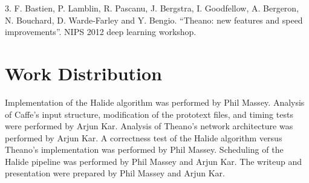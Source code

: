 \documentclass[11pt,twoside]{article}
\begin{document}
3.  F. Bastien, P. Lamblin, R. Pascanu, J. Bergstra, I. Goodfellow, A. Bergeron, N. Bouchard, D. Warde-Farley and Y. Bengio. “Theano: new features and speed improvements”. NIPS 2012 deep learning workshop.

\section{Work Distribution}

Implementation of the Halide algorithm was performed by Phil Massey.  
Analysis of Caffe's input structure, modification of the prototext files, and timing tests were performed by Arjun Kar.  
Analysis of Theano's network architecture was performed by Arjun Kar.  
A correctness test of the Halide algorithm versus Theano's implementation was performed by Phil Massey. 
Scheduling of the Halide pipeline was performed by Phil Massey and Arjun Kar.  
The writeup and presentation were prepared by Phil Massey and Arjun Kar.
\end{document}
